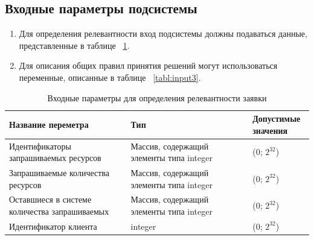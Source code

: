 \documentclass[utf8x, 12pt]{G7-32}
\begin{document}
\subsection{Входные параметры подсистемы}

\begin{enumerate}
        \item Для определения релевантности вход подсистемы должны подаваться данные,
        представленные в таблице ~\ref{tabl:input2}.
        \item Для описания общих правил принятия решений могут использоваться
        переменные, описанные в таблице ~\ref{tabl:input3}.
\end{enumerate}

\begin{table}[ht!]
        \caption{Входные параметры для определения релевантности заявки}
        \begin{center}
                \begin{tabular}{|p{0.4\linewidth}|p{0.4\linewidth}|p{0.2\linewidth}|}
                        \hline
                        \textbf{Название переметра} & \textbf{Тип} & \textbf{Допустимые значения}\\
                        \hline
                        Идентификаторы запрашиваемых ресурсов & Массив, содержащий элементы типа integer & (0; $2^{32}$) \\    
                        \hline   
                        Запрашиваемые количества ресурсов & Массив, содержащий элементы типа integer & (0; $2^{32}$) \\    
                        \hline   
                        Оставшиеся в системе количества запрашиваемых & Массив, содержащий элементы типа integer & (0; $2^{32}$) \\    
                        \hline   
                        Идентификатор клиента & integer & (0; $2^{32}$) \\    
                        \hline   
               \end{tabular}        
               \label{tabl:input2}
        \end{center}
\end{table}
\end{document}
